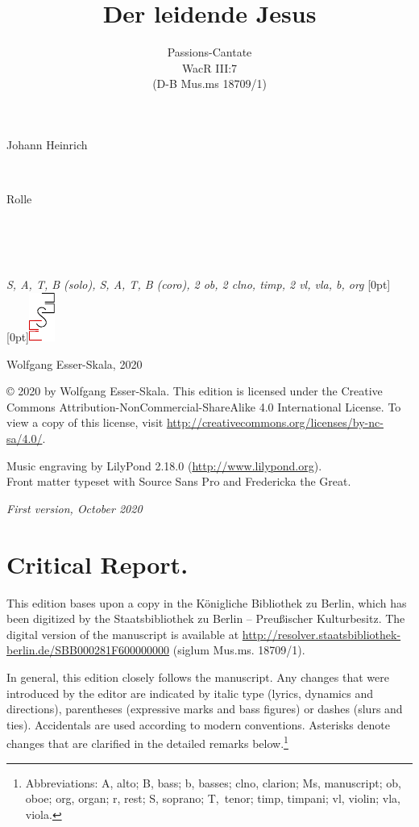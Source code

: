 \documentclass[parskip=full]{scrreprt}
\makeatletter
\DeclareRobustCommand{\sbseries}{\fontseries{sb}\selectfont}
\newcommand\fancytitlehead{
	\headingfont%
	\fontsize{80}{80}\selectfont\textcolor{black!80}{\@ifundefined{@shortname}{\@lastname}{\@shortname}.}\\[15pt]%
	\fontsize{50}{50}\selectfont\@ifundefined{@shorttitle}{\@title}{\@shorttitle}.%
}
\def\firstname#1{\def\@firstname{#1}}
\def\lastname#1{\def\@lastname{#1}}
\def\instrumentation#1{\def\@instrumentation{#1}}
\def\maketitle{%
\begin{titlepage}%
	\Large%
	{\@titlehead}%
	\vfill%
	{\strut\@firstname}\\%
	{\sbseries\color{oldred}\strut\@lastname}\\%
	{\strut\@namesuffix}%
	\vfill%
	{\sbseries\@title}\\%
	{\@subtitle}\\[\baselineskip]%
	{\itshape\@instrumentation}%
	\vfill%
	{\itshape\@parts}\hspace*{\fill}\raisebox{0pt}[0pt][0pt]{\includegraphics{ees_logo}}%
\end{titlepage}%
}
\newif\ifprintreport\printreportfalse
\makeatother
\begin{document}
\frenchspacing

\titlehead{\fancytitlehead}
\firstname{Johann Heinrich}
\lastname{Rolle}
\title{Der leidende Jesus}
\subtitle{Passions-Cantate\\WacR III:7\\(D-B Mus.ms 18709/1)}
\instrumentation{S, A, T, B (solo), S, A, T, B (coro), 2 ob, 2 clno, timp, 2 vl, vla, b, org}
\maketitle


\thispagestyle{empty}

\vspace*{\fill}

\hspace*{1em}Wolfgang Esser-Skala, 2020

© 2020 by Wolfgang Esser-Skala. This edition is licensed under the Creative Commons Attribution-NonCommercial-ShareAlike 4.0 International License. To view a copy of this license, visit \url{http://creativecommons.org/licenses/by-nc-sa/4.0/}. 

Music engraving by LilyPond 2.18.0 (\url{http://www.lilypond.org}).\\
Front matter typeset with Source Sans Pro and Fredericka the Great.

\textit{First version, October 2020}

\vspace*{2cm}

\ifprintreport
\chapter*{Critical Report.}

This edition bases upon a copy in the Königliche Bibliothek zu Berlin, which has been digitized by the Staatsbibliothek zu Berlin – Preußischer Kulturbesitz. The digital version of the manuscript is available at \url{http://resolver.staatsbibliothek-berlin.de/SBB000281F600000000} (siglum Mus.ms. 18709/1).

In general, this edition closely follows the manuscript. Any changes that were introduced by the editor are indicated by italic type (lyrics, dynamics and directions), parentheses (expressive marks and bass figures) or dashes (slurs and ties). Accidentals are used according to modern conventions. Asterisks denote changes that are clarified in the detailed remarks below.\footnote{Abbreviations: A, alto; B, bass; b, basses; clno, clarion; Ms, manuscript; ob, oboe; org, organ; r, rest; S, soprano; T,~tenor; timp, timpani; vl, violin; vla, viola.}
\end{document}
